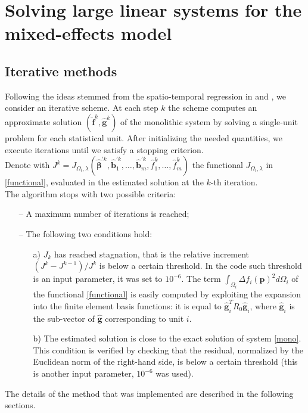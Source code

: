 
\chapter{Solving large linear systems for the mixed-effects model}
\label{ch:chapter_name}
\section{Iterative methods}

Following the ideas stemmed from the spatio-temporal regression in
\citeauthor{pollini} \cite{pollini} and \citeauthor{massardi} \cite{massardi},
we consider an iterative scheme. At each step $k$ the scheme computes an
approximate solution $(\hat{\bm{f}}^{k},\hat{\bm{g}}^{k})$ of the monolithic
system by solving a single-unit problem for each statistical unit. After
initializing the needed quantities, we execute iterations until we satisfy a
stopping criterion.\\ Denote with $J^k = J_{\Omega_i, \lambda}\left(
	\hat{\bm{\beta}}^{\prime k}, \hat{\bm{b}}^{\prime k}_1, \dots,
	\hat{\bm{b}}^{\prime k}_m, \hat{f}_1^k, \dots, \hat{f}_m^k \right)$ the
functional $J_{\Omega_i, \lambda}$ in \ref{functional}, evaluated in the
estimated solution at the $k$-th iteration.\\ The algorithm stops with two
possible criteria:
\begin{itemize}
	\item[--]A maximum number of iterations is reached;
	\item[--] The following two
		conditions hold:
		\begin{enumerate}
			\item[a)] $J_k$ has reached stagnation, that is the relative increment $\left( J^k - J^{k-1}\right) / J^k$
				is below a certain threshold. In the code such threshold is an input parameter,
				it was set to $10^{-6}$. The term $ \int_{\Omega_i} \Delta f_i
					\left(\bm{p}\right)^2 d\Omega_i $ of the functional \ref{functional} is easily
				computed by exploiting the expansion into the finite element basis functions:
				it is equal to $\hat{\bm{g}}_i^T R_0 \hat{\bm{g}}_i$, where $\hat{\bm{g}}_i $
				is the sub-vector of $\hat{\bm{g}}$ corresponding to unit $i$.
			\item[b)] The estimated solution is close to the exact solution of system
				\ref{mono}. This condition is verified by checking that the residual,
				normalized by the Euclidean norm of the right-hand side, is below a certain
				threshold (this is another input parameter, $10^{-6}$ was used).
		\end{enumerate}
\end{itemize}
The details of the method that was implemented are described in the
following sections.

